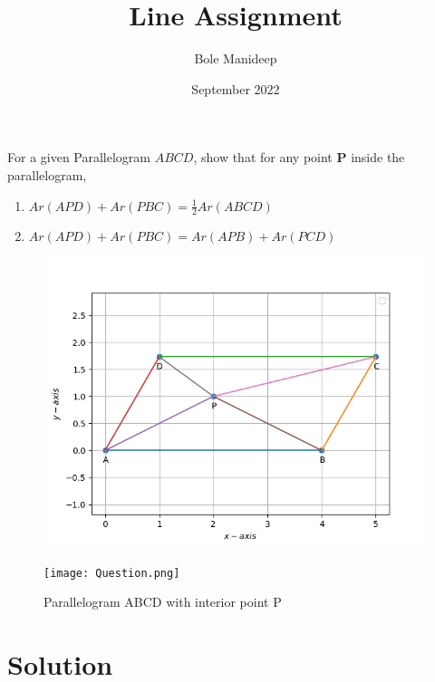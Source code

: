 \documentclass[journal,10pt,twocolumn]{article}
\title{\textbf{Line Assignment}}
\author{Bole Manideep}
\date{September 2022}
\let\vec\mathbf
\begin{document}
\maketitle
\fi
For a given Parallelogram $ABCD$, show that for any
point $\vec{P}$ inside the parallelogram,
\begin{enumerate}
	\item $Ar(APD)+Ar(PBC) = \frac{1}{2}Ar(ABCD)$
	\item $Ar(APD)+Ar(PBC) = Ar(APB)+Ar(PCD)$
\end{enumerate}

	\begin{figure}[!h]
		\centering
 \includegraphics[width=\columnwidth]{chapters/9/9/2/4/figs/Question.png}
		\caption{}
		\label{fig:9/9/2/4}
  	\end{figure}
	\iffalse
\begin{figure}[h]
\centering
\texttt{[image: Question.png]}
\caption{Parallelogram ABCD with interior point P}
\label{fig:Parallelogram}
\end{figure}

\section*{Solution}
\end{document}
